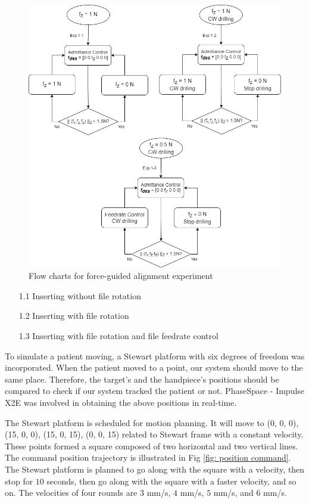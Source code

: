 \begin{figure}[htbp]
\begin{center}
\includegraphics[width=1\linewidth]{Images/Exp1_motion planning.png}
\caption{Flow charts for force-guided alignment experiment}
\label{fig:exp_motion planning}
\end{center}
\end{figure}	

\begin{enumerate}
\item[1.1] Inserting without file rotation
\item[1.2] Inserting with file rotation
\item[1.3] Inserting with file rotation and file feedrate control
\end{enumerate}
\par
To simulate a patient moving, a Stewart platform with six degrees of freedom was incorporated.  When the patient moved to a point, our system should move to the same place. Therefore, the target's and the handpiece's positions should be compared to check if our system tracked the patient or not. PhaseSpace - Impulse X2E was involved in obtaining the above positions in real-time. 
\par
The Stewart platform is scheduled for motion planning. It will move to (0, 0, 0), (15, 0, 0), (15, 0, 15), (0, 0, 15) related to Stewart frame with a constant velocity. These points formed a square composed of two horizontal and two vertical lines. The command position trajectory is illustrated in Fig \ref{fig: position command}. The Stewart platform is planned to go along with the square with a velocity, then stop for $10$ seconds, then go along with the square with a faster velocity, and so on. The velocities of four rounds are $3$ mm/s, $4$ mm/s, $5$ mm/s, and $6$ mm/s.
	
